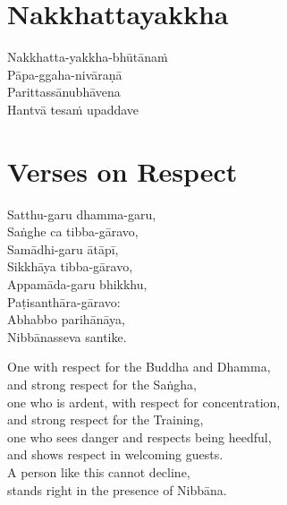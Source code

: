 \section{Nakkhattayakkha}



\bigskip

\begin{paritta}
  Nakkhatta-yakkha-bhūtānaṁ\\
  Pāpa-ggaha-nivāraṇā\\
  Parittassānubhāvena\\
  Hantvā tesaṁ upaddave
\end{paritta}


\section{Verses on Respect}



Satthu-garu dhamma-garu,\\
Saṅghe ca tibba-gāravo,\\
Samādhi-garu ātāpī,\\
Sikkhāya tibba-gāravo,\\
Appamāda-garu bhikkhu,\\
Paṭisanthāra-gāravo:\\
Abhabbo parihānāya,\\
Nibbānasseva santike.

\begin{english}
  One with respect for the Buddha and Dhamma,\\
  and strong respect for the Saṅgha,\\
  one who is ardent, with respect for concentration,\\
  and strong respect for the Training,\\
  one who sees danger and respects being heedful,\\
  and shows respect in welcoming guests.\\
  A person like this cannot decline,\\
  stands right in the presence of Nibbāna. 
\end{english}
